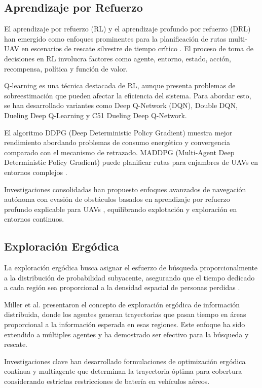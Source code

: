 \subsection{Aprendizaje por Refuerzo}

El aprendizaje por refuerzo (RL) y el aprendizaje profundo por refuerzo (DRL) han emergido como enfoques prominentes para la planificación de rutas multi-UAV en escenarios de rescate silvestre de tiempo crítico \cite{hayat2020, yue2025, ewers2025deep}. El proceso de toma de decisiones en RL involucra factores como agente, entorno, estado, acción, recompensa, política y función de valor.

Q-learning es una técnica destacada de RL, aunque presenta problemas de sobreestimación que pueden afectar la eficiencia del sistema. Para abordar esto, se han desarrollado variantes como Deep Q-Network (DQN), Double DQN, Dueling Deep Q-Learning y C51 Dueling Deep Q-Network.

El algoritmo DDPG (Deep Deterministic Policy Gradient) muestra mejor rendimiento abordando problemas de consumo energético y convergencia comparado con el mecanismo de retrazado. MADDPG (Multi-Agent Deep Deterministic Policy Gradient) puede planificar rutas para enjambres de UAVs en entornos complejos \cite{jeon2024}.

Investigaciones consolidadas han propuesto enfoques avanzados de navegación autónoma con evasión de obstáculos basados en aprendizaje por refuerzo profundo explicable para UAVs \cite{wang2025}, equilibrando explotación y exploración en entornos continuos.

\subsection{Exploración Ergódica}

La exploración ergódica busca asignar el esfuerzo de búsqueda proporcionalmente a la distribución de probabilidad subyacente, asegurando que el tiempo dedicado a cada región sea proporcional a la densidad espacial de personas perdidas \cite{miller2016, ivic2019}.

Miller et al. \cite{miller2016} presentaron el concepto de exploración ergódica de información distribuida, donde los agentes generan trayectorias que pasan tiempo en áreas proporcional a la información esperada en esas regiones. Este enfoque ha sido extendido a múltiples agentes y ha demostrado ser efectivo para la búsqueda y rescate.

Investigaciones clave \cite{rao2023, seewald2024} han desarrollado formulaciones de optimización ergódica continua y multiagente que determinan la trayectoria óptima para cobertura considerando estrictas restricciones de batería en vehículos aéreos.

